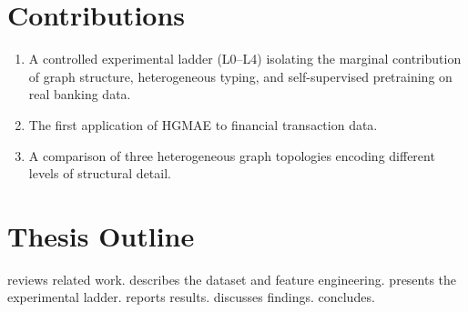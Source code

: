 \section{Contributions}
\label{sec:contributions}

\begin{enumerate}[nosep]
  \item A controlled experimental ladder (L0--L4) isolating the marginal contribution of graph structure, heterogeneous typing, and self-supervised pretraining on real banking data.
  \item The first application of HGMAE to financial transaction data.
  \item A comparison of three heterogeneous graph topologies encoding different levels of structural detail.
\end{enumerate}

\section{Thesis Outline}
\label{sec:outline}

 reviews related work.
 describes the dataset and feature engineering.
 presents the experimental ladder.
 reports results.
 discusses findings.
 concludes.
